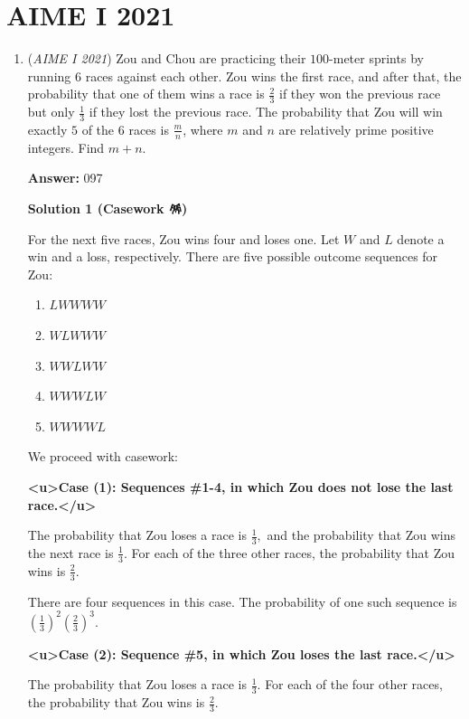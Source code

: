 \section{AIME I 2021}
        \begin{enumerate}
        	\item (\textit{AIME I 2021}) Zou and Chou are practicing their $100$-meter sprints by running $6$ races against each other. Zou wins the first race, and after that, the probability that one of them wins a race is $\frac23$ if they won the previous race but only $\frac13$ if they lost the previous race. The probability that Zou will win exactly $5$ of the $6$ races is $\frac mn$, where $m$ and $n$ are relatively prime positive integers. Find $m+n$.


 
 \textbf{Answer: }097



\textbf{Solution 1 (Casework 🪅)}

For the next five races, Zou wins four and loses one. Let $W$ and $L$ denote a win and a loss, respectively. There are five possible outcome sequences for Zou:

 
            \begin{enumerate} 
        \item $LWWWW$

        \item $WLWWW$

        \item $WWLWW$

        \item $WWWLW$

        \item $WWWWL$

            \end{enumerate}
            We proceed with casework:

 \textbf{<u>Case (1): Sequences \#1-4, in which Zou does not lose the last race.</u>}

 The probability that Zou loses a race is $\frac13,$ and the probability that Zou wins the next race is $\frac13.$ For each of the three other races, the probability that Zou wins is $\frac23.$

 There are four sequences in this case. The probability of one such sequence is $\left(\frac13\right)^2\left(\frac23\right)^3.$

 \textbf{<u>Case (2): Sequence \#5, in which Zou loses the last race.</u>}

 The probability that Zou loses a race is $\frac13.$ For each of the four other races, the probability that Zou wins is $\frac23.$


\end{enumerate}
